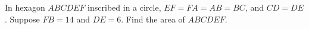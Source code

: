 In hexagon $ABCDEF$ inscribed in a circle, $EF = F A = AB = BC$, and $CD = DE$. Suppose $FB = 14$ and $DE = 6$. Find the area of $ABCDEF$.
